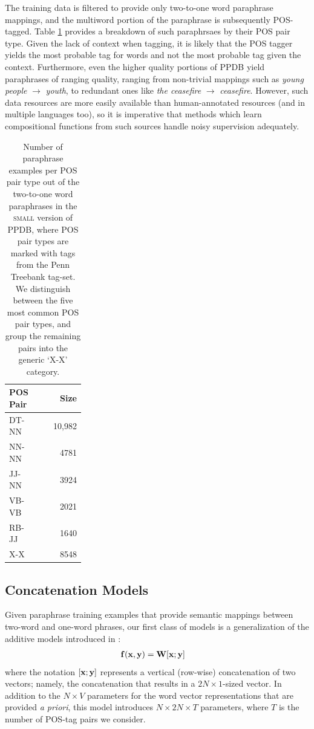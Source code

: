 \documentclass[11pt,letterpaper]{article}
\newcommand{\bX}{{\bf x}}
\newcommand{\bY}{{\bf y}}
\newcommand{\bF}{{\bf f}}
\newcommand{\bW}{{\bf W}}
\begin{document}
The training data is filtered to provide only two-to-one word paraphrase mappings, and the multiword portion of the paraphrase is subsequently POS-tagged.
Table \ref{tab:pos-stats} provides a breakdown of such paraphrsaes by their POS pair type.  
Given the lack of context when tagging, it is likely that the POS tagger yields the most probable tag for words and not the most probable tag given the context. 
Furthermore, even the higher quality portions of PPDB yield paraphrases of ranging quality, ranging from non-trivial mappings such as \emph{young people} $\rightarrow$ \emph{youth}, to redundant ones like \emph{the ceasefire} $\rightarrow$ \emph{ceasefire}. 
However, such data resources are more easily available than human-annotated resources (and in multiple languages too), so it is imperative that methods which learn compositional functions from such sources handle noisy supervision adequately. 

\begin{table}[h!]
  \begin{center}
    \begin{tabular}{p{0.25\linewidth}r}
      \hline
      POS Pair & Size \\
	  \hline
      DT-NN & 10,982 \\
	  NN-NN &  4781 \\
	  JJ-NN & 3924 \\
  	  VB-VB  &  2021 \\
      RB-JJ &  1640 \\
	  X-X  & 8548 \\
	\end{tabular}
  \end{center}
  \caption{Number of paraphrase examples per POS pair type out of the two-to-one word paraphrases in the \textsc{small} version of PPDB, where POS pair types are marked with tags from the Penn Treebank tag-set. We distinguish between the five most common POS pair types, and group the remaining pairs into the generic `X-X' category.}
  \label{tab:pos-stats}
\end{table}

\subsection{Concatenation Models}
\label{sec:concat}

Given paraphrase training examples that provide semantic mappings between two-word and one-word phrases, our first class of models is a generalization of the additive models introduced in :
\begin{align}
	\bF (\bX, \bY) &= \bW [\bX;\bY]
	\label{eq:concat}
\end{align}
where the notation $[\bX; \bY]$ represents a vertical (row-wise) concatenation of two vectors; namely, the concatenation that results in a $2N \times 1$-sized vector.  
In addition to the $N \times V$ parameters for the word vector representations that are provided \emph{a priori}, this model introduces $N \times 2N \times T$ parameters, where $T$ is the number of POS-tag pairs we consider.  
\end{document}
